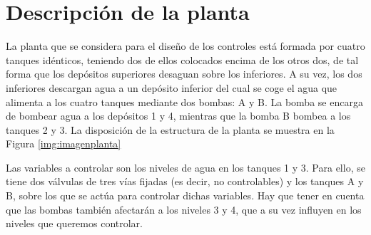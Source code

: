 %
%

\section{Descripción de la planta}
	
	La planta que se considera para el diseño de los controles está formada por cuatro tanques idénticos, teniendo dos de ellos colocados encima de los otros dos, de tal forma que los depósitos superiores desaguan sobre los inferiores. A su vez, los dos inferiores descargan agua a un depósito inferior del cual se coge el agua que alimenta a los cuatro tanques mediante dos bombas: A y B. La bomba se encarga de bombear agua a los depósitos 1 y 4, mientras que la bomba B bombea a los tanques 2 y 3. La disposición de la estructura de la planta se muestra en la Figura \ref{img:imagenplanta}\\
	
	
	Las variables a controlar son los niveles de agua en los tanques 1 y 3. Para ello, se tiene dos válvulas de tres vías fijadas (es decir, no controlables) y los tanques A y B, sobre los que se actúa para controlar dichas variables. Hay que tener en cuenta que las bombas también afectarán a los niveles 3 y 4, que a su vez influyen en los niveles que queremos controlar. 
	
	
	
